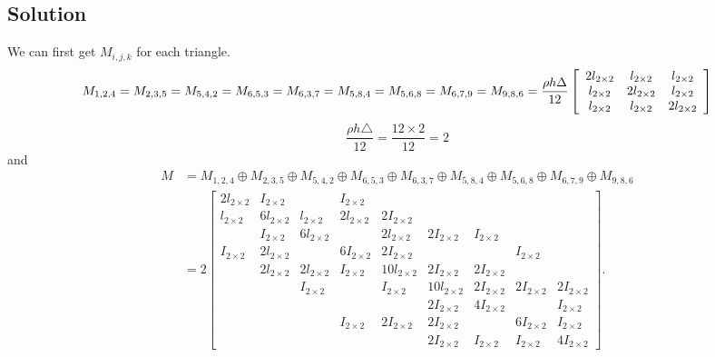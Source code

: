 \documentclass{article}
\begin{document}
\subsection*{Solution}
We can first get $M_{i,j,k}$ for each triangle.\\
\begin{equation}
  M_{1,2,4}=M_{2,3,5}=M_{5,4,2}=M_{6,5,3}=M_{6,3,7}=M_{5,8,4}=M_{5,6,8}=M_{6,7,9}=M_{9,8,6}= \\
  \frac{\rho h \Delta}{12}\left[\begin{array}{ccc}
  2 l_{2 \times 2} & l_{2 \times 2} & l_{2 \times 2} \\
  l_{2 \times 2} & 2 l_{2 \times 2} & l_{2 \times 2} \\
  l_{2 \times 2} & l_{2 \times 2} & 2 l_{2 \times 2}
  \end{array}\right]
\end{equation}
\begin{equation*}
  \frac{\rho h \triangle}{12} = \frac{12 \times 2}{12} = 2
\end{equation*}
and\\
\begin{equation}
  \begin{aligned}
  M & =M_{1,2,4} \oplus M_{2,3,5} \oplus M_{5,4,2} \oplus M_{6,5,3} \oplus M_{6,3,7} \oplus M_{5,8,4} \oplus M_{5,6,8} \oplus M_{6,7,9} \oplus M_{9,8,6} \\
  & = 2 \left[\begin{array}{ccccccccc}
  2 l_{2 \times 2} & I_{2 \times 2} & & I_{2 \times 2} & & &\\
  l_{2 \times 2} & 6 l_{2 \times 2} & l_{2 \times 2} & 2 l_{2 \times 2} & 2 I_{2 \times 2} & & & \\
  & I_{2 \times 2} & 6 l_{2 \times 2} & & 2 l_{2 \times 2} & 2 I_{2 \times 2} & I_{2 \times 2} & & \\
  I_{2 \times 2} & 2 l_{2 \times 2} & & 6 I_{2 \times 2} & 2 I_{2 \times 2} & & & I_{2 \times 2}\\
  & 2 l_{2 \times 2} & 2 l_{2 \times 2} & I_{2 \times 2} & 10 l_{2 \times 2} & 2 I_{2 \times 2} & 2 I_{2 \times 2} & \\
  & & I_{2 \times 2} & & I_{2 \times 2} & 10 l_{2 \times 2} & 2 I_{2 \times 2} & 2 I_{2 \times 2} & 2 I_{2 \times 2} \\
  & & & & & 2 I_{2 \times 2} & 4 I_{2 \times 2} & & I_{2 \times 2} \\
  & & & I_{2 \times 2} & 2 I_{2 \times 2} & 2 I_{2 \times 2} & & 6 I_{2 \times 2} & I_{2 \times 2} \\
  & & & & & 2 I_{2 \times 2} & I_{2 \times 2} & I_{2 \times 2} & 4 I_{2 \times 2}
  \end{array}\right] .
  \end{aligned}
  \end{equation}
\end{document}
